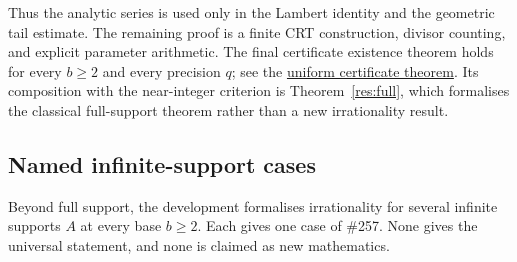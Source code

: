 \documentclass[11pt]{article}
\newcommand{\commit}{312b96c0d149ed466725c62d4ef24cfc91bca34e}
\newcommand{\repobase}{https://github.com/wcook04/plectis-lean-erdos249-257/blob/\commit}
\newcommand{\PK}{Erdos249257}
\newcommand{\lword}[4]{\href{\repobase/\PK/#1\#L#2}{#4}}
\theoremstyle{definition}
\theoremstyle{remark}
\begin{document}
Thus the analytic series is used only in the Lambert identity and the
geometric tail estimate.  The remaining proof is a finite CRT construction,
divisor counting, and explicit parameter arithmetic.  The final certificate
existence theorem holds for every $b\geq2$ and every precision $q$; see the
\lword{CertificateKernel.lean}{7859}{exists_weighted_block_certificates}{uniform certificate theorem}.
Its composition with the near-integer criterion is
Theorem~\ref{res:full}, which formalises the classical full-support theorem rather than a new
irrationality result.

\subsection{Named infinite-support cases}

Beyond full support, the development formalises irrationality for several
infinite supports $A$ at every base $b\ge2$.  Each gives one case of \#257.
None gives the universal statement, and none is claimed as new mathematics.
\end{document}
